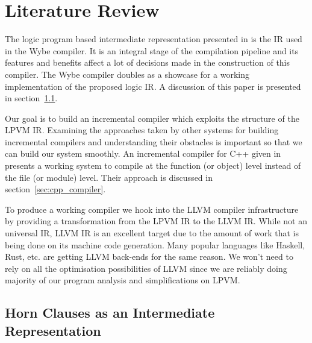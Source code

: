 \chapter{Literature Review}
\label{chap:literature_review}


The logic program based intermediate representation presented in
\cite{lpvm2015} is the IR used in the Wybe compiler. It is an integral stage of
the compilation pipeline and its features and benefits affect a lot of
decisions made in the construction of this compiler. The Wybe compiler doubles
as a showcase for a working implementation of the proposed logic IR. A
discussion of this paper is presented in section~\ref{sec:horn_clauses}.

Our goal is to build an incremental compiler which exploits the structure of
the LPVM IR. Examining the approaches taken by other systems for building
incremental compilers and understanding their obstacles is important so that we
can build our system smoothly. An incremental compiler for C++ given in
\cite{cpp_compiler} presents a working system to compile at the function (or
object) level instead of the file (or module) level. Their approach is
discussed in section~\ref{sec:cpp_compiler}.




To produce a working compiler we hook into the LLVM compiler infrastructure
\citep{Lattner:MSThesis02} by providing a transformation from the LPVM IR to
the LLVM IR. While not an universal IR, LLVM IR is an excellent target due to
the amount of work that is being done on its machine code generation. Many
popular languages like Haskell, Rust, etc. are getting LLVM back-ends for the
same reason. We won't need to rely on all the optimisation possibilities of
LLVM since we are reliably doing majority of our program analysis and
simplifications on LPVM. 


\section{Horn Clauses as an Intermediate Representation \citep{lpvm2015}}
\label{sec:horn_clauses}


